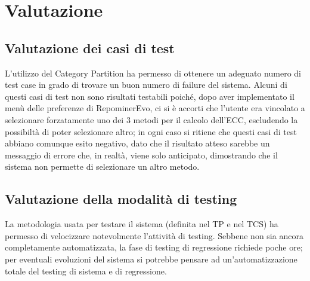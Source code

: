 \chapter{Valutazione}
\section{Valutazione dei casi di test}
L'utilizzo del Category Partition ha permesso di ottenere un adeguato numero di test case in grado di trovare un buon numero di failure del sistema.
Alcuni di questi casi di test non sono risultati testabili poiché, dopo aver implementato il menù delle preferenze di RepominerEvo, ci si è accorti che l'utente era vincolato a selezionare forzatamente uno dei 3 metodi per il calcolo dell'ECC, escludendo la possibiltà di poter selezionare altro; in ogni caso si ritiene che questi casi di test abbiano comunque esito negativo, dato che il risultato atteso sarebbe un messaggio di errore che, in realtà, viene solo anticipato, dimostrando che il sistema non permette di selezionare un altro metodo.

\section{Valutazione della modalità di testing}
La metodologia usata per testare il sistema (definita nel TP e nel TCS) ha permesso di velocizzare notevolmente l'attività di testing. Sebbene non sia ancora completamente automatizzata, la fase di testing di regressione richiede poche ore; per eventuali evoluzioni del sistema si potrebbe pensare ad un'automatizzazione totale del testing di sistema e di regressione.